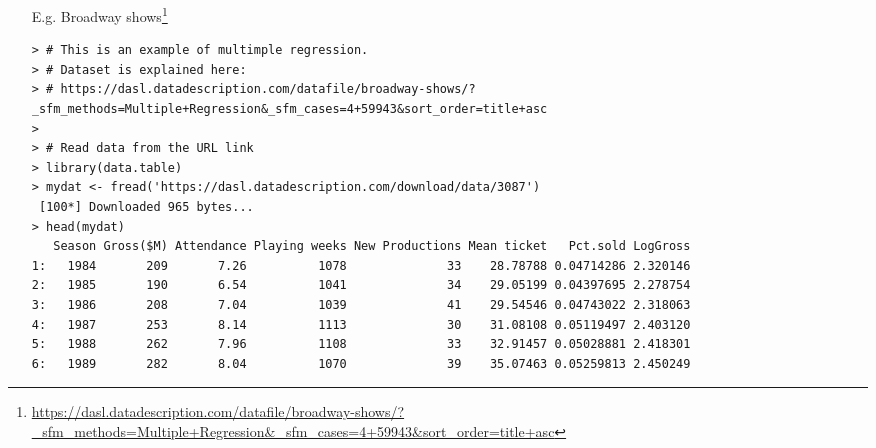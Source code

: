 \begin{frame}[fragile]


	\begin{enumerate}
		\item[E.g.] Broadway shows\footnote{\url{https://dasl.datadescription.com/datafile/broadway-shows/?_sfm_methods=Multiple+Regression&_sfm_cases=4+59943&sort_order=title+asc}}
			\vfill
		\item[]
\begin{lstlisting}
> # This is an example of multimple regression.
> # Dataset is explained here:
> # https://dasl.datadescription.com/datafile/broadway-shows/?_sfm_methods=Multiple+Regression&_sfm_cases=4+59943&sort_order=title+asc
>
> # Read data from the URL link
> library(data.table)
> mydat <- fread('https://dasl.datadescription.com/download/data/3087')
 [100*] Downloaded 965 bytes...
> head(mydat)
   Season Gross($M) Attendance Playing weeks New Productions Mean ticket   Pct.sold LogGross
1:   1984       209       7.26          1078              33    28.78788 0.04714286 2.320146
2:   1985       190       6.54          1041              34    29.05199 0.04397695 2.278754
3:   1986       208       7.04          1039              41    29.54546 0.04743022 2.318063
4:   1987       253       8.14          1113              30    31.08108 0.05119497 2.403120
5:   1988       262       7.96          1108              33    32.91457 0.05028881 2.418301
6:   1989       282       8.04          1070              39    35.07463 0.05259813 2.450249
\end{lstlisting}
	\end{enumerate}

\end{frame}
